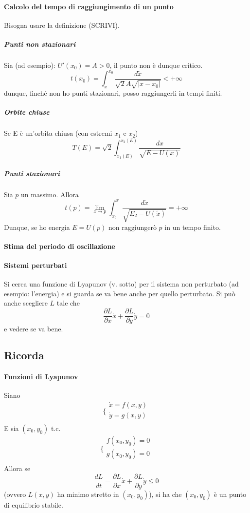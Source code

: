 \documentclass[a4paper,12pt]{article}
\begin{document}
\paragraph{Calcolo del tempo di raggiungimento di un punto}
Bisogna usare la definizione (SCRIVI).
\subparagraph{Punti non stazionari}
Sia (ad esempio): $U'(x_0) = A > 0$, il punto non è dunque critico.
$$t(x_0) = \int_x^{x_0} \dfrac{d\tilde{x}}{\sqrt{2}A\sqrt{|x-x_0|}} < +\infty$$
dunque, finché non ho punti stazionari, posso raggiungerli in tempi finiti.
\subparagraph{Orbite chiuse}
Se E è un'orbita chiusa (con estremi $x_1$ e $x_2$)
$$ T(E) = \sqrt{2}\int_{x_1(E)}^{x_2(E)} \dfrac{dx}{\sqrt{E-U(x)}}$$
\subparagraph{Punti stazionari}
Sia $p$ un massimo.
Allora
$$t(p) = \lim_{x\to p} \int_{x_0}^x \dfrac{d\tilde{x}}{\sqrt{E_2 - U(\tilde{x})}} = +\infty$$
Dunque, se ho energia $E = U(p)$ non raggiungerò $p$ in un tempo finito.

\paragraph{Stima del periodo di oscillazione}


\paragraph{Sistemi perturbati}
Si cerca una funzione di Lyapunov (v. sotto) per il sistema non perturbato (ad esempio: l'energia) e si guarda se va bene anche per quello perturbato. Si può anche scegliere $L$ tale che $$\dfrac{\partial L}{\partial x}\dot{x} + \dfrac{\partial L}{\partial y}\dot{y} = 0 $$ e vedere se va bene.

\subsection{Ricorda}

\paragraph{Funzioni di Lyapunov}
Siano
$$\bigg\{ \begin{array}{l}
\dot{x} = f(x,y)\\
\dot{y} = g(x,y)\\
\end{array}$$
E sia $(x_0, y_0)$ t.c.
$$\bigg\{ \begin{array}{l}
f(x_0,y_0) = 0\\
g(x_0,y_0) = 0\\
\end{array}$$
Allora se
$$ \dfrac{dL}{dt} = \dfrac{\partial L}{\partial x}\dot{x} + \dfrac{\partial L}{\partial y}\dot{y} \leq 0 $$
(ovvero $L(x, y)$ ha minimo stretto in $(x_0, y_0)$), si ha che $(x_0,y_0)$ è un punto di equilibrio stabile.
\end{document}
